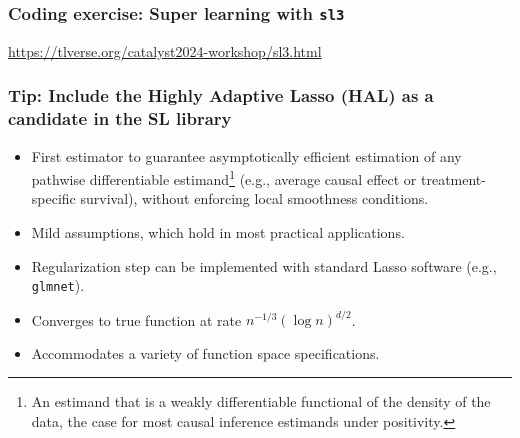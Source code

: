 \documentclass[t]{beamer}
\begin{document}
\begin{frame}
  \frametitle{Coding exercise: Super learning with \texttt{sl3}}
  \url{https://tlverse.org/catalyst2024-workshop/sl3.html}
\end{frame}


\begin{frame}
\frametitle{Tip: Include the Highly Adaptive Lasso (HAL) as a candidate in the SL library}
\begin{itemize}
    \item First estimator to guarantee asymptotically efficient estimation of
      any pathwise differentiable estimand\footnote{An estimand that is a weakly
      differentiable functional of the density of the data, the case for most
      causal inference estimands under positivity.} (e.g., average causal effect
      or treatment-specific survival), without enforcing local smoothness
      conditions.
    \item Mild assumptions, which hold in most practical applications.
    \item Regularization step can be implemented with standard Lasso software
      (e.g., \texttt{glmnet}).
    \item Converges to true function at rate $n^{-1/3}(\log n)^{d/2}$.
    \item Accommodates a variety of function space specifications.
\end{itemize}
\end{frame}
\end{document}

